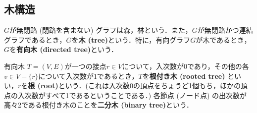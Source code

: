 \subsection{木構造}
\begin{definition}
    $G$が無閉路 (閉路を含まない) グラフは森，林という．また，$G$が無閉路かつ連結グラフであるとき，$G$を\textbf{木 (tree)}という．特に，有向グラフ$G$が木であるとき，$G$を\textbf{有向木 (directed tree)}という．
\end{definition}

\begin{definition}
    有向木 $T=(V,E)$が一つの接点$r\in V$について，入次数が0であり，その他の各$v\in V-\{r\}$について入次数が1であるとき，$T$を\textbf{根付き木 (rooted tree)} といい，$r$を\textbf{根 (root)}という．(これは入次数0の頂点をちょうど1個もち，ほかの頂点の入次数がすべて1であるということである．) 各節点 (ノード点) の出次数が高々2である根付き木のことを\textbf{二分木 (binary tree)}という． 
\end{definition}